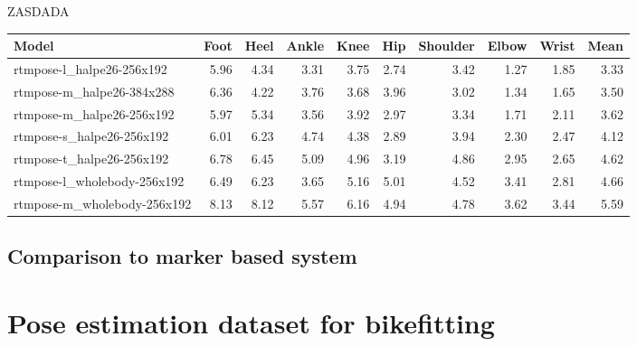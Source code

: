 ZASDADA

\begin{tabular}{p{3.5cm} rrrrrrrrr}
    \toprule
    \textbf{Model}               & \textbf{Foot} & \textbf{Heel} & \textbf{Ankle} & \textbf{Knee} & \textbf{Hip} & \textbf{Shoulde}r & \textbf{Elbow} & \textbf{Wrist} & \textbf{Mean} \\

    \midrule
    rtmpose-l\_halpe26-256x192   & 5.96          & 4.34          & 3.31           & 3.75          & 2.74         & 3.42              & 1.27           & 1.85           & 3.33          \\
    rtmpose-m\_halpe26-384x288   & 6.36          & 4.22          & 3.76           & 3.68          & 3.96         & 3.02              & 1.34           & 1.65           & 3.50          \\
    rtmpose-m\_halpe26-256x192   & 5.97          & 5.34          & 3.56           & 3.92          & 2.97         & 3.34              & 1.71           & 2.11           & 3.62          \\
    rtmpose-s\_halpe26-256x192   & 6.01          & 6.23          & 4.74           & 4.38          & 2.89         & 3.94              & 2.30           & 2.47           & 4.12          \\
    rtmpose-t\_halpe26-256x192   & 6.78          & 6.45          & 5.09           & 4.96          & 3.19         & 4.86              & 2.95           & 2.65           & 4.62          \\
    rtmpose-l\_wholebody-256x192 & 6.49          & 6.23          & 3.65           & 5.16          & 5.01         & 4.52              & 3.41           & 2.81           & 4.66          \\
    rtmpose-m\_wholebody-256x192 & 8.13          & 8.12          & 5.57           & 6.16          & 4.94         & 4.78              & 3.62           & 3.44           & 5.59          \\
    \bottomrule
\end{tabular}

\section{Comparison to marker based system}



\chapter{Pose estimation dataset for bikefitting}

